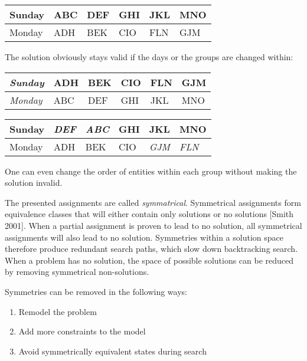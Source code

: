 \documentclass[a4paper]{scrartcl}
\begin{document}
\begin{table}[h]
\centering
\begin{tabular}{| l | l | l | l| l | l |}
\hline
Sunday & ABC & DEF & GHI & JKL & MNO \\
\hline
Monday & ADH  & BEK & CIO & FLN & GJM \\
\hline
\end{tabular}
\end{table}

The solution obviously stays valid if the days or the groups are changed within:

\begin{table}[h]
\centering
\begin{tabular}{| l | l | l | l| l | l |}
\hline
\emph{Sunday} & ADH  & BEK & CIO & FLN & GJM \\
\hline
\emph{Monday} & ABC & DEF & GHI & JKL & MNO \\
\hline
\end{tabular}
\end{table}

\begin{table}[h]
\centering
\begin{tabular}{| l | l | l | l| l | l |}
\hline
Sunday & \emph{DEF} & \emph{ABC} & GHI & JKL & MNO \\
\hline
Monday & ADH  & BEK & CIO & \emph{GJM} & \emph{FLN}\\
\hline
\end{tabular}
\end{table}

One can even change the order of entities within each group without making the solution invalid.

The presented assignments are called \emph{symmatrical}. Symmetrical assignments form equivalence classes that will either contain only solutions or no solutions [Smith 2001]. When a partial assignment is proven to lead to no solution, all symmetrical assignments will also lead to no solution. Symmetries within a solution space therefore produce redundant search paths, which slow down backtracking search. When a problem has no solution, the space of possible solutions can be reduced by removing symmetrical non-solutions.

Symmetries can be removed in the following ways:

\begin{enumerate}
\item Remodel the problem
\item Add more constraints to the model
\item Avoid symmetrically equivalent states during search
\end{enumerate}
\end{document}
